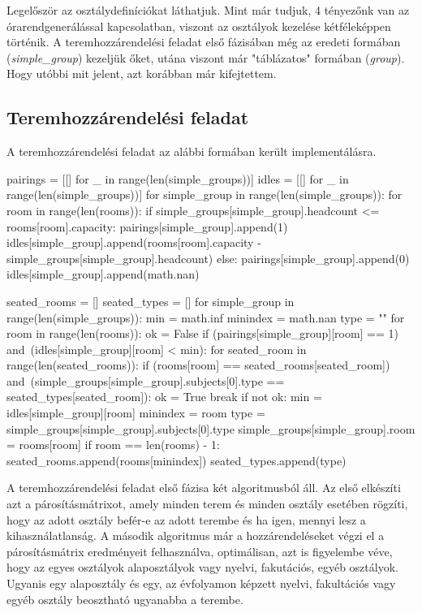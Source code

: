 Legelőször az osztálydefiníciókat láthatjuk. Mint már tudjuk, 4 tényezőnk van az órarendgenerálással kapcsolatban, viszont az osztályok kezelése kétféleképpen történik. A teremhozzárendelési feladat első fázisában még az eredeti formában (\textit{simple\_group}) kezeljük őket, utána viszont már "táblázatos" formában (\textit{group}). Hogy utóbbi mit jelent, azt korábban már kifejtettem.

\subsection{Teremhozzárendelési feladat}

A teremhozzárendelési feladat az alábbi formában került implementálásra.

\begin{python}
pairings = [[] for _ in range(len(simple_groups))]
idles = [[] for _ in range(len(simple_groups))]
for simple_group in range(len(simple_groups)):
    for room in range(len(rooms)):
        if simple_groups[simple_group].headcount <= rooms[room].capacity:
            pairings[simple_group].append(1)
            idles[simple_group].append(rooms[room].capacity -
            simple_groups[simple_group].headcount)
        else:
            pairings[simple_group].append(0)
            idles[simple_group].append(math.nan)

seated_rooms = []
seated_types = []
for simple_group in range(len(simple_groups)):
    min = math.inf
    minindex = math.nan
    type = ""
    for room in range(len(rooms)):
        ok = False
        if (pairings[simple_group][room] == 1) and\
           (idles[simple_group][room] < min):
            for seated_room in range(len(seated_rooms)):
                if (rooms[room] == seated_rooms[seated_room]) and\
                   (simple_groups[simple_group].subjects[0].type ==
                    seated_types[seated_room]):
                    ok = True
                    break
            if not ok:
                min = idles[simple_group][room]
                minindex = room
                type = simple_groups[simple_group].subjects[0].type
                simple_groups[simple_group].room = rooms[room]
        if room == len(rooms) - 1:
            seated_rooms.append(rooms[minindex])
            seated_types.append(type)
\end{python}

A teremhozzárendelési feladat első fázisa két algoritmusból áll. Az első elkészíti azt a párosításmátrixot, amely minden terem és minden osztály esetében rögzíti, hogy az adott osztály befér-e az adott terembe és ha igen, mennyi lesz a kihasználatlanság. A második algoritmus már a hozzárendeléseket végzi el a párosításmátrix eredményeit felhasználva, optimálisan, azt is figyelembe véve, hogy az egyes osztályok alaposztályok vagy nyelvi, fakutációs, egyéb osztályok. Ugyanis egy alaposztály és egy, az évfolyamon képzett nyelvi, fakultációs vagy egyéb osztály beosztható ugyanabba a terembe.

